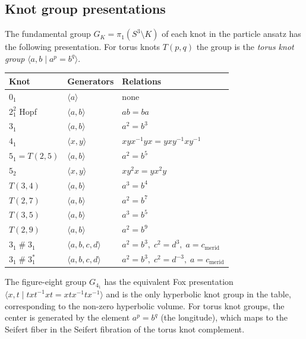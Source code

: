 \subsection{Knot group presentations}
\label{subsec:knot-groups}

\begin{remark}
\label{rem:knot-groups}
The fundamental group $G_K = \pi_1(S^3 \setminus K)$ of each knot in the
particle ansatz has the following presentation.  For torus knots
$T(p,q)$ the group is the \emph{torus knot group}
$\langle a, b \mid a^p = b^q \rangle$.

\medskip
{\renewcommand{\arraystretch}{1.3}
\begin{tabular}{lll}
\hline
\textbf{Knot} & \textbf{Generators} & \textbf{Relations} \\
\hline
$0_1$ & $\langle a \rangle$ & none \\
$2^2_1$ Hopf & $\langle a, b \rangle$ & $ab = ba$ \\
$3_1$ & $\langle a, b \rangle$ & $a^2 = b^3$ \\
$4_1$ & $\langle x, y \rangle$ & $xyx^{-1}yx = yxy^{-1}xy^{-1}$ \\
$5_1 = T(2,5)$ & $\langle a, b \rangle$ & $a^2 = b^5$ \\
$5_2$ & $\langle x, y \rangle$ & $xy^2x = yx^2y$ \\
$T(3,4)$ & $\langle a, b \rangle$ & $a^3 = b^4$ \\
$T(2,7)$ & $\langle a, b \rangle$ & $a^2 = b^7$ \\
$T(3,5)$ & $\langle a, b \rangle$ & $a^3 = b^5$ \\
$T(2,9)$ & $\langle a, b \rangle$ & $a^2 = b^9$ \\
$3_1\mathbin{\#}3_1$ & $\langle a,b,c,d \rangle$
  & $a^2=b^3,\;c^2=d^3,\;a=c_{\mathrm{merid}}$ \\
$3_1\mathbin{\#}3_1^*$ & $\langle a,b,c,d \rangle$
  & $a^2=b^3,\;c^2=d^{-3},\;a=c_{\mathrm{merid}}$ \\
\hline
\end{tabular}}

\medskip\noindent
The figure-eight group $G_{4_1}$ has the equivalent Fox presentation
$\langle x,t \mid txt^{-1}xt = xtx^{-1}tx^{-1}\rangle$ and is the only
hyperbolic knot group in the table, corresponding to the non-zero
hyperbolic volume.  For torus knot groups, the center is generated by
the element $a^p = b^q$ (the longitude), which maps to the Seifert fiber
in the Seifert fibration of the torus knot complement.
\end{remark}

